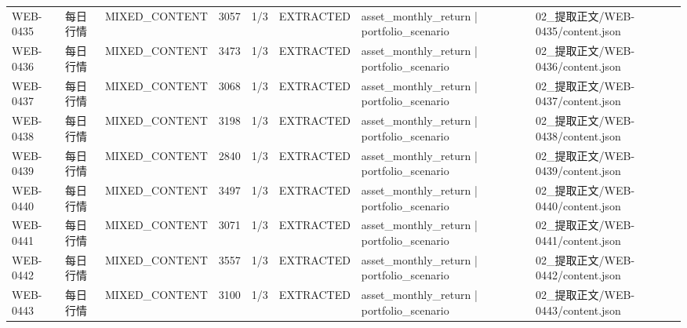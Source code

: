 \begin{landscape}
\begin{longtable}{p{1.8cm}p{4.2cm}p{3.0cm}p{1.4cm}p{1.6cm}p{2.4cm}p{4.2cm}p{4.2cm}}
WEB-0435 & 每日行情 & MIXED\_\allowbreak{}CONTENT & 3057 & 1/\allowbreak{}3 & EXTRACTED & asset\_\allowbreak{}monthly\_\allowbreak{}return | portfolio\_\allowbreak{}scenario & 02\_\allowbreak{}提取正文/\allowbreak{}WEB-0435/\allowbreak{}content.json\\
WEB-0436 & 每日行情 & MIXED\_\allowbreak{}CONTENT & 3473 & 1/\allowbreak{}3 & EXTRACTED & asset\_\allowbreak{}monthly\_\allowbreak{}return | portfolio\_\allowbreak{}scenario & 02\_\allowbreak{}提取正文/\allowbreak{}WEB-0436/\allowbreak{}content.json\\
WEB-0437 & 每日行情 & MIXED\_\allowbreak{}CONTENT & 3068 & 1/\allowbreak{}3 & EXTRACTED & asset\_\allowbreak{}monthly\_\allowbreak{}return | portfolio\_\allowbreak{}scenario & 02\_\allowbreak{}提取正文/\allowbreak{}WEB-0437/\allowbreak{}content.json\\
WEB-0438 & 每日行情 & MIXED\_\allowbreak{}CONTENT & 3198 & 1/\allowbreak{}3 & EXTRACTED & asset\_\allowbreak{}monthly\_\allowbreak{}return | portfolio\_\allowbreak{}scenario & 02\_\allowbreak{}提取正文/\allowbreak{}WEB-0438/\allowbreak{}content.json\\
WEB-0439 & 每日行情 & MIXED\_\allowbreak{}CONTENT & 2840 & 1/\allowbreak{}3 & EXTRACTED & asset\_\allowbreak{}monthly\_\allowbreak{}return | portfolio\_\allowbreak{}scenario & 02\_\allowbreak{}提取正文/\allowbreak{}WEB-0439/\allowbreak{}content.json\\
WEB-0440 & 每日行情 & MIXED\_\allowbreak{}CONTENT & 3497 & 1/\allowbreak{}3 & EXTRACTED & asset\_\allowbreak{}monthly\_\allowbreak{}return | portfolio\_\allowbreak{}scenario & 02\_\allowbreak{}提取正文/\allowbreak{}WEB-0440/\allowbreak{}content.json\\
WEB-0441 & 每日行情 & MIXED\_\allowbreak{}CONTENT & 3071 & 1/\allowbreak{}3 & EXTRACTED & asset\_\allowbreak{}monthly\_\allowbreak{}return | portfolio\_\allowbreak{}scenario & 02\_\allowbreak{}提取正文/\allowbreak{}WEB-0441/\allowbreak{}content.json\\
WEB-0442 & 每日行情 & MIXED\_\allowbreak{}CONTENT & 3557 & 1/\allowbreak{}3 & EXTRACTED & asset\_\allowbreak{}monthly\_\allowbreak{}return | portfolio\_\allowbreak{}scenario & 02\_\allowbreak{}提取正文/\allowbreak{}WEB-0442/\allowbreak{}content.json\\
WEB-0443 & 每日行情 & MIXED\_\allowbreak{}CONTENT & 3100 & 1/\allowbreak{}3 & EXTRACTED & asset\_\allowbreak{}monthly\_\allowbreak{}return | portfolio\_\allowbreak{}scenario & 02\_\allowbreak{}提取正文/\allowbreak{}WEB-0443/\allowbreak{}content.json\\

\end{longtable}
\end{landscape}
